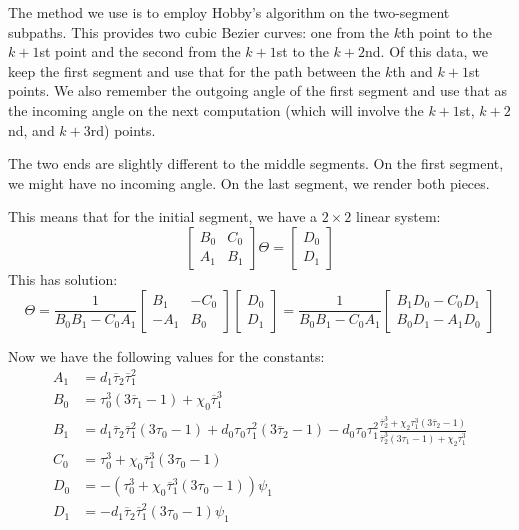 \documentclass{article}
\begin{document}
The method we use is to employ Hobby's algorithm on the two-{}segment subpaths.
This provides two cubic Bezier curves: one from the \(k\)th point to the \(k+1\)st point and the second from the \(k+1\)st to the \(k+2\)nd.
Of this data, we keep the first segment and use that for the path between the \(k\)th and \(k+1\)st points.
We also remember the outgoing angle of the first segment and use that as the incoming angle on the next computation (which will involve the \(k+1\)st, \(k+2\)nd, and \(k+3\)rd) points.

The two ends are slightly different to the middle segments.
On the first segment, we might have no incoming angle.
On the last segment, we render both pieces.

This means that for the initial segment, we have a \(2 \times 2\) linear system:
%
\[
  \begin{bmatrix}
  B_0 & C_0 \\
  A_1 & B_1
  \end{bmatrix}
  \Theta = \begin{bmatrix}
  D_0 \\ D_1
  \end{bmatrix}
\]
%
This has solution:
%
\[
  \Theta = \frac{1}{B_0 B_1 - C_0 A_1} \begin{bmatrix} B_1 & - C_0 \\ -A_1 & B_0 \end{bmatrix} \begin{bmatrix} D_0 \\ D_1 \end{bmatrix} =  \frac{1}{B_0 B_1 - C_0 A_1} \begin{bmatrix} B_1 D_0 - C_0 D_1 \\ B_0 D_1 - A_1 D_0 \end{bmatrix}
\]

Now we have the following values for the constants:
%
\begin{align*}
A_1 &= d_1 \overline{\tau}_2 \overline{\tau}_1^2 \\
%
B_0 &= \tau_0^3 (3 \overline{\tau}_1 - 1) + \chi_0 \overline{\tau}_1^3 \\
%
B_1 &= d_1 \overline{\tau}_2 \overline{\tau}_1^2 (3 \tau_0 - 1) + d_0 \tau_0 \tau_1^2(3 \overline{\tau}_2 - 1) - d_0 \tau_0 \tau_1^2 \frac{\overline{\tau}_2^3 + \chi_2 \tau_1^3 (3 \overline{\tau}_2 - 1)}{\overline{\tau}_2^3 (3 \tau_1 - 1) + \chi_2 \tau_1^3} \\
%
C_0 &= \tau_0^3 + \chi_0 \overline{\tau}_1^3 (3 \tau_0 - 1) \\
%
D_0 &= - (\tau_0^3 + \chi_0 \overline{\tau}_1^3 ( 3 \tau_0 - 1)) \psi_1 \\
%
D_1 &= - d_1 \overline{\tau}_2 \overline{\tau}_1^2 (3 \tau_0 - 1) \psi_1
\end{align*}
%
\end{document}
